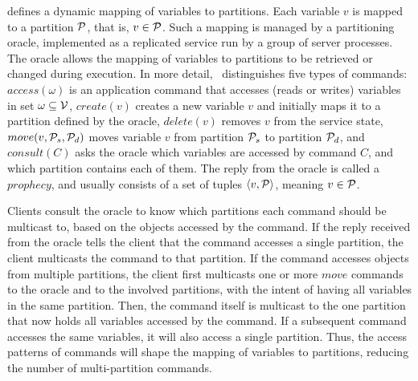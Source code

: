 \dynastar defines a dynamic mapping of variables to partitions.
Each variable $v$ is mapped to a partition $\mathcal{P}$, that is, $v \in \mathcal{P}$.
Such a mapping is managed by a partitioning oracle, implemented as a replicated service run by a group of server processes.
The oracle allows the mapping of variables to partitions to be retrieved or changed during execution.
In more detail, \dssmr\ distinguishes five types of commands:
$access(\omega)$ is an application command that accesses (reads or writes) variables in set $\omega \subseteq \mathcal{V}$,
$create(v)$ creates a new variable $v$ and initially maps it to a partition defined by the oracle,
$delete(v)$ removes $v$ from the service state,
$move(v,\mathcal{P}_s,\mathcal{P}_d)$ moves variable $v$ from partition $\mathcal{P}_s$ to partition $\mathcal{P}_d$,
and $consult(C)$ asks the oracle which variables are accessed by command $C$, and which partition contains each of them.
The reply from the oracle is called a $prophecy$, and usually consists of a set of tuples $\langle v, \mathcal{P} \rangle$, meaning $v \in \mathcal{P}$.


Clients consult the oracle to know which partitions each command should be multicast to, based on the objects accessed by the command.
If the reply received from the oracle tells the client that the command accesses a single partition, the client multicasts the command to that partition.
If the command accesses objects from multiple partitions, the client first multicasts one or more $move$ commands to the oracle and to the involved partitions, with the intent of having all variables in the same partition.
Then, the command itself is multicast to the one partition that now holds all variables accessed by the command.
If a subsequent command accesses the same variables, it will also access a single partition.
Thus, the access patterns of commands will shape the mapping of variables to partitions, reducing the number of multi-partition commands.

